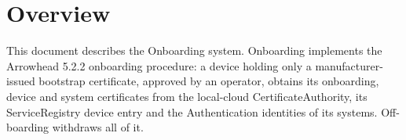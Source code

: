 \documentclass[a4paper]{arrowhead}
\begin{document}
\sloppy

\ArrowheadSetup

\begin{center}
  \vspace*{1cm}
  \huge{\arrowtitle}

  \vspace*{0.2cm}
  \LARGE{\arrowtype}
  \vspace*{1cm}

  \vspace*{\fill}


  \vspace*{1cm}
  \vspace*{\fill}

  \begin{abstract}
    This document describes the Onboarding support system of the Eclipse Arrowhead 5.2.2 framework, as implemented in \texttt{ah5-Onboarding-java-spring} of the primary Java source tree (\texttt{Eclipse-Arrowhead-java}) and deployed with the standalone Compose definition of that folder.
  \end{abstract}

  \vspace*{1cm}
\end{center}

\newpage

\tableofcontents
\newpage

\section{Overview}
\label{sec:overview}

This document describes the Onboarding system. Onboarding implements the Arrowhead 5.2.2 onboarding procedure: a device holding only a manufacturer-issued bootstrap certificate, approved by an operator, obtains its onboarding, device and system certificates from the local-cloud Certificate\allowbreak{}Authority, its ServiceRegistry device entry and the Authentication identities of its systems. Off-boarding withdraws all of it.
\end{document}
